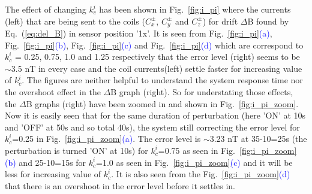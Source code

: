 \FloatBarrier
The effect of changing $k_c^i$ has been shown in Fig.~\ref{fig:i_pi} where the currents (left) that are being sent to the coils ($C_x^\pm$, $C_y^\pm$ and $C_z^\pm$) for drift $\Delta$B found by Eq.~(\ref{eq:del_B}) in sensor position '1x'.  It is seen from Fig.~\ref{fig:i_pi}\textcolor{blue}{(a)}, Fig.~\ref{fig:i_pi}\textcolor{blue}{(b)}, Fig.~\ref{fig:i_pi}\textcolor{blue}{(c)} and Fig.~\ref{fig:i_pi}\textcolor{blue}{(d)} which are correspond to $k_c^i$ = 0.25, 0.75, 1.0 and 1.25 respectively that the error level (right) seems to be $\sim$3.5 nT in every case and the coil currents(left) settle  faster for increasing value of $k_c^i$. The figures are neither helpful to understand the system response time nor the overshoot effect in the $\Delta$B graph (right). So for understating those effects, the $\Delta$B graphs (right) have been zoomed in and shown in Fig.~\ref{fig:i_pi_zoom}. Now it is easily seen that for the same duration of perturbation (here 'ON' at 10s and 'OFF' at 50s and so total 40s), the system still correcting the error level for $k_c^i$=0.25 in Fig.~\ref{fig:i_pi_zoom}\textcolor{blue}{(a)}. The error level is $\sim$3.23 nT  at 35-10=25s (the perturbation is turned 'ON' at 10s) for $k_c^i$=0.75 as seen in Fig.~\ref{fig:i_pi_zoom}\textcolor{blue}{(b)} and 25-10=15s for $k_c^i$=1.0  as seen in Fig.~\ref{fig:i_pi_zoom}\textcolor{blue}{(c)} and it will be less for increasing value of $k_c^i$. It is also seen from the Fig.~\ref{fig:i_pi_zoom}\textcolor{blue}{(d)} that there is an overshoot in the error level before it settles in.

